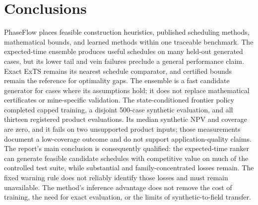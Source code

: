 \documentclass[11pt]{article}
\begin{document}
\section{Conclusions}
PhaseFlow places feasible construction heuristics, published scheduling methods, mathematical bounds, and learned methods within one traceable benchmark. The expected-time ensemble produces useful schedules on many held-out generated cases, but its lower tail and vein failures preclude a general performance claim. Exact ExTS remains its nearest schedule comparator, and certified bounds remain the reference for optimality gaps. The ensemble is a fast candidate generator for cases where its assumptions hold; it does not replace mathematical certificates or mine-specific validation. The state-conditioned frontier policy completed capped training, a disjoint 500-case synthetic evaluation, and all thirteen registered product evaluations. Its median synthetic NPV and coverage are zero, and it fails on two unsupported product inputs; those measurements document a low-coverage outcome and do not support application-quality claims.
The report's main conclusion is consequently qualified: the expected-time ranker can generate feasible candidate schedules with competitive value on much of the controlled test suite, while substantial and family-concentrated losses remain. The fixed warning rule does not reliably identify those losses and must remain unavailable. The method's inference advantage does not remove the cost of training, the need for exact evaluation, or the limits of synthetic-to-field transfer.
\end{document}
